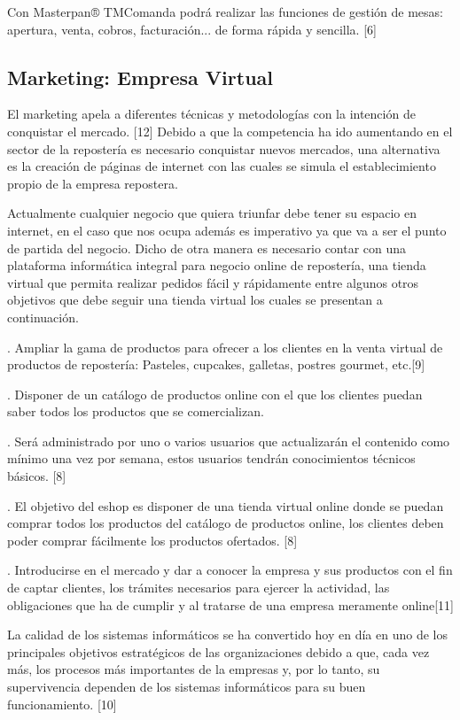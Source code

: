 \documentclass{bmcart}
\begin{document}
Con Masterpan® TMComanda podrá realizar las funciones de gestión de mesas: apertura, venta, cobros, facturación... de forma rápida y sencilla. [6]


\subsection{Marketing: Empresa Virtual}

El marketing apela a diferentes técnicas y metodologías con la intención de conquistar el mercado. [12]
Debido a que la competencia ha ido aumentando en el sector de la repostería es necesario conquistar nuevos mercados, una alternativa es la creación de páginas de internet con las cuales se simula el establecimiento propio de la empresa repostera.

Actualmente cualquier negocio que quiera triunfar debe tener su espacio en internet, en el caso que nos ocupa además es imperativo ya que va a ser el punto de partida del negocio.
Dicho de otra manera es necesario contar con una plataforma informática integral para negocio online de repostería, una tienda virtual que permita realizar pedidos fácil y rápidamente entre algunos otros objetivos que debe seguir una tienda virtual los cuales se presentan a continuación.



. Ampliar la gama de productos para ofrecer a los clientes en la venta virtual de productos de repostería: Pasteles, cupcakes, galletas, postres gourmet, etc.[9]

. Disponer de un catálogo de productos online con el que los clientes puedan saber todos los productos que se comercializan.


. Será administrado por uno o varios usuarios que actualizarán el contenido como mínimo una vez por semana, estos usuarios tendrán conocimientos técnicos básicos. [8]


. El objetivo del eshop es disponer de una tienda virtual online donde se puedan comprar todos los productos del catálogo de productos online, los clientes deben poder comprar fácilmente los productos ofertados. [8]


. Introducirse en el mercado y dar a conocer la empresa y sus productos con el fin de captar clientes, los trámites necesarios para ejercer la actividad, las obligaciones que ha de cumplir y al tratarse de una empresa meramente online[11]


La calidad de los sistemas informáticos se ha convertido hoy en día en uno de los principales objetivos estratégicos de las organizaciones debido a que, cada vez más, los procesos más importantes de la empresas y, por lo tanto, su supervivencia dependen de los sistemas informáticos para su buen funcionamiento. [10]
\end{document}
